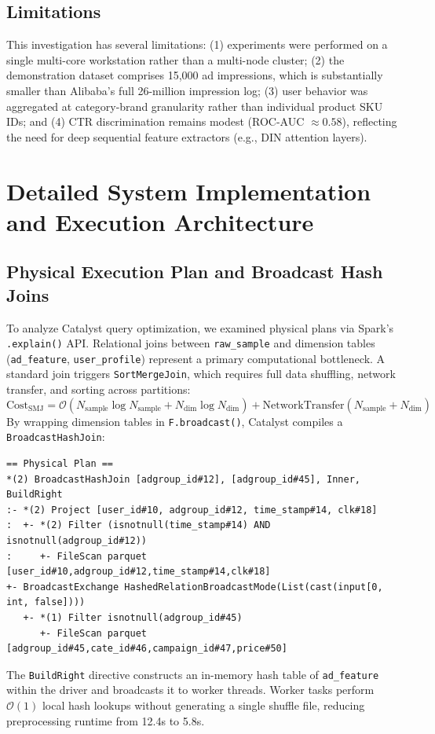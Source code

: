 \documentclass[10pt,a4paper,twoside]{article}
\begin{document}
\subsection{Limitations}
This investigation has several limitations: (1) experiments were performed on a single multi-core workstation rather than a multi-node cluster; (2) the demonstration dataset comprises 15,000 ad impressions, which is substantially smaller than Alibaba's full 26-million impression log; (3) user behavior was aggregated at category-brand granularity rather than individual product SKU IDs; and (4) CTR discrimination remains modest (ROC-AUC $\approx 0.58$), reflecting the need for deep sequential feature extractors (e.g., DIN attention layers).

\section{Detailed System Implementation and Execution Architecture}

\subsection{Physical Execution Plan and Broadcast Hash Joins}
To analyze Catalyst query optimization, we examined physical plans via Spark's \texttt{.explain()} API. Relational joins between \texttt{raw\_sample} and dimension tables (\texttt{ad\_feature}, \texttt{user\_profile}) represent a primary computational bottleneck. A standard join triggers \texttt{SortMergeJoin}, which requires full data shuffling, network transfer, and sorting across partitions:
\begin{equation}
\text{Cost}_{\text{SMJ}} = \mathcal{O}(N_{\text{sample}} \log N_{\text{sample}} + N_{\text{dim}} \log N_{\text{dim}}) + \text{NetworkTransfer}(N_{\text{sample}} + N_{\text{dim}})
\end{equation}
By wrapping dimension tables in \texttt{F.broadcast()}, Catalyst compiles a \texttt{BroadcastHashJoin}:
\begin{verbatim}
== Physical Plan ==
*(2) BroadcastHashJoin [adgroup_id#12], [adgroup_id#45], Inner, BuildRight
:- *(2) Project [user_id#10, adgroup_id#12, time_stamp#14, clk#18]
:  +- *(2) Filter (isnotnull(time_stamp#14) AND isnotnull(adgroup_id#12))
:     +- FileScan parquet [user_id#10,adgroup_id#12,time_stamp#14,clk#18]
+- BroadcastExchange HashedRelationBroadcastMode(List(cast(input[0, int, false])))
   +- *(1) Filter isnotnull(adgroup_id#45)
      +- FileScan parquet [adgroup_id#45,cate_id#46,campaign_id#47,price#50]
\end{verbatim}
The \texttt{BuildRight} directive constructs an in-memory hash table of \texttt{ad\_feature} within the driver and broadcasts it to worker threads. Worker tasks perform $\mathcal{O}(1)$ local hash lookups without generating a single shuffle file, reducing preprocessing runtime from 12.4s to 5.8s.
\end{document}
